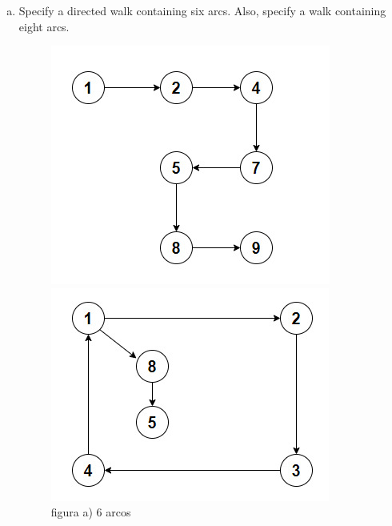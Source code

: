 \documentclass{report}
\begin{document}
\begin{enumerate}[2.1]
\begin{enumerate}[(a)]
        \item Specify a directed walk containing six arcs. Also, specify a walk containing eight
        arcs.
        \newline
        \begin{figure}[ht]
            \begin{minipage}[b]{0.4\linewidth}
            \centering
            \includegraphics[width=\linewidth]{probelam2.1incisocfiguraa.jpg}
            \caption{figura a) 6 arcos}
            \label{fig:figura1}
            \end{minipage}
            \hspace{0.5cm}
            \begin{minipage}[b]{0.4\linewidth}
            \centering
            \includegraphics[width=\linewidth]{problema2.21incisocfigurab.jpg}

\end{minipage}
\end{figure}
\end{enumerate}
\end{enumerate}
\end{document}
